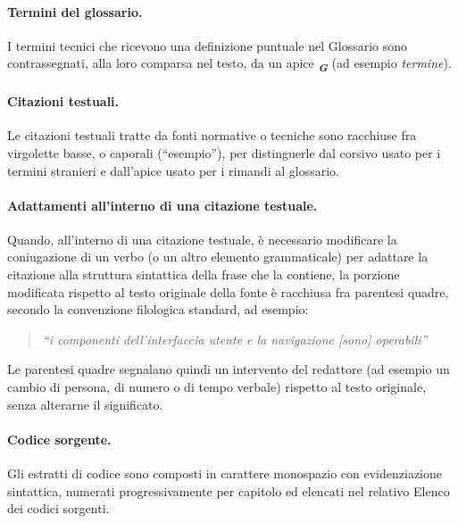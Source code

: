 \paragraph*{Termini del glossario.} I termini tecnici che ricevono una definizione puntuale nel Glossario sono contrassegnati, alla loro comparsa nel testo, da un apice \textsubscript{\textbf{\textit{G}}} (ad esempio \emph{termine}\glox).

\paragraph*{Citazioni testuali.} Le citazioni testuali tratte da fonti normative o tecniche sono racchiuse fra virgolette basse, o caporali (\enquote{esempio}), per distinguerle dal corsivo usato per i termini stranieri e dall'apice usato per i rimandi al glossario.

\paragraph*{Adattamenti all'interno di una citazione testuale.} Quando, all'interno di una citazione testuale, è necessario modificare la coniugazione di un verbo (o un altro elemento grammaticale) per adattare la citazione alla struttura sintattica della frase che la contiene, la porzione modificata rispetto al testo originale della fonte è racchiusa fra parentesi quadre, secondo la convenzione filologica standard, ad esempio:
\begin{quote}
\itshape \enquote{i componenti dell'interfaccia utente e la navigazione [sono] operabili}
\end{quote}
Le parentesi quadre segnalano quindi un intervento del redattore (ad esempio un cambio di persona, di numero o di tempo verbale) rispetto al testo originale, senza alterarne il significato.

\paragraph*{Codice sorgente.} Gli estratti di codice sono composti in carattere monospazio con evidenziazione sintattica, numerati progressivamente per capitolo ed elencati nel relativo Elenco dei codici sorgenti.
\endgroup